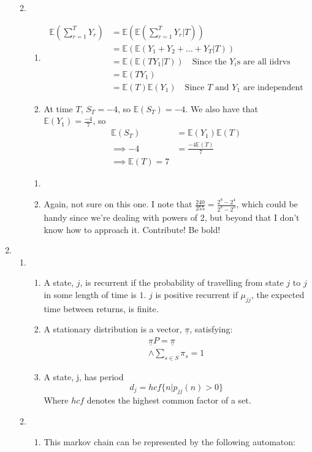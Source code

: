 \documentclass{article}
\begin{document}
\begin{enumerate}
\begin{enumerate}
\begin{enumerate}
\end{enumerate}
\item
\begin{enumerate}
\item
\begin{align*}
\mathbb{E}(\sum^T_{r=1}Y_r) &= \mathbb{E}(\mathbb{E}(\sum^T_{r=1}Y_r|T))\\
&= \mathbb{E}(\mathbb{E}(Y_1+Y_2+\dots+Y_T|T))\\
&= \mathbb{E}(\mathbb{E}(TY_1|T)) \quad \mbox{Since the $Y_i$s are all iidrvs}\\
&= \mathbb{E}(TY_1)\\
&= \mathbb{E}(T)\mathbb{E}(Y_1) \quad \mbox{Since $T$ and $Y_1$ are independent}
\end{align*}
\item
At time $T$, $S_T = -4$, so $\mathbb{E}(S_T) = -4$. We also have that $\mathbb{E}(Y_1) = \frac{-4}{7}$, so
\begin{align*}
\mathbb{E}(S_T)&=\mathbb{E}(Y_1)\mathbb{E}(T)\\
\implies -4 &= \frac{-4\mathbb{E}(T)}{7}\\
\implies \mathbb{E}(T) = 7
\end{align*}
\end{enumerate}
\begin{enumerate}
\item

\item Again, not sure on this one. I note that $\frac{240}{255} = \frac{2^8-2^4}{2^8-2^0}$, which could be handy since we're dealing with powers of 2, but beyond that I don't know how to approach it. Contribute! Be bold!
\end{enumerate}

\end{enumerate}
\clearpage
\item
\begin{enumerate}
\item
\begin{enumerate}
\item A state, $j$, is recurrent if the probability of travelling from state $j$ to $j$ in some length of time is $1$. $j$ is positive recurrent if $\mu_{jj}$, the expected time between returns, is finite.

\item A stationary distribution is a vector, $\underline{\pi}$, satisfying:
\begin{align*}
\underline{\pi} P = \underline{\pi} \\
\wedge \sum_{s \in S} \pi_s = 1
\end{align*}
\item
A state, j, has period
$$
d_j = hcf\{n|p_{jj}(n)>0\}
$$
Where $hcf$ denotes the highest common factor of a set.
\end{enumerate}
\item
\begin{enumerate}
\item
This markov chain can be represented by the following automaton:


\end{enumerate}
\end{enumerate}
\end{enumerate}
\end{document}
